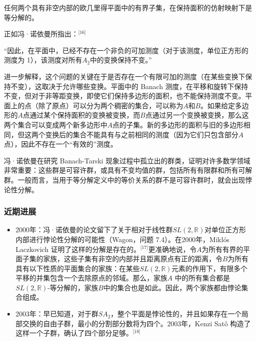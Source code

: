 任何两个具有非空内部的欧几里得平面中的有界子集，在保持面积的仿射映射下是等分解的。

正如冯·诺依曼所指出：\(^\text{[16]}\)

“因此，在平面中，已经不存在一个非负的可加测度（对于该测度，单位正方形的测度为 1），该测度对所有\( A_2 \)中的变换保持不变。”

进一步解释，这个问题的关键在于是否存在一个有限可加的测度（在某些变换下保持不变），这取决于允许哪些变换。平面中的 Banach 测度，在平移和旋转下保持不变，但对于非等距变换，即使它们保持多边形的面积，也不能保持测度不变。平面上的点（除了原点）可以分为两个稠密的集合，可以称为\( A \)和\( B \)。如果给定多边形的\( A \)点通过某个保持面积的变换被变换，而\( B \)点通过另一个变换被变换，那么这两个集合可以变成两个新多边形中\( A \)点的子集。新的多边形的面积与旧的多边形相同，但这两个变换后的集合不能具有与之前相同的测度（因为它们只包含部分\( A \)点），因此不存在一个“有效的”测度。

冯·诺依曼在研究 Banach-Tarski 现象过程中孤立出的群类，证明对许多数学领域非常重要：这些群是可容许群，或具有不变均值的群，包括所有有限群和所有可解群。一般而言，当用于等分解定义中的等价关系的群不是可容许群时，就会出现悖论性分解。
\subsubsection{近期进展}  
\begin{itemize}
\item 2000年：冯·诺依曼的论文留下了关于相对于线性群\( SL(2, \mathbb{R}) \)对单位正方形内部进行悖论性分解的可能性（Wagon，问题 7.4）。在2000年，Miklós Laczkovich 证明了这样的分解是存在的。\(^\text{[17]}\)更准确地说，令\( A \)为所有有界的平面子集的家族，这些子集有非空的内部并且距离原点有正的距离，令\( B \)为所有具有以下性质的平面集合的家族：在某些\( SL(2, \mathbb{R}) \)元素的作用下，有限多个平移的并集包含一个去除原点的邻域。那么，家族\( A \) 中的所有集合都是\( SL(2, \mathbb{R}) \)-等分解的，家族\( B \)中的集合也是如此。因此，两个家族都由悖论集合组成。
\item 2003年：早已知道，对于群\( SA_2 \)，整个平面是悖论性的，并且如果存在一个局部交换的自由子群，最小的分割部分数将为四个。2003年，Kenzi Satô 构造了这样一个子群，确认了四个部分足够。\(^\text{[18]}\)


\end{itemize}